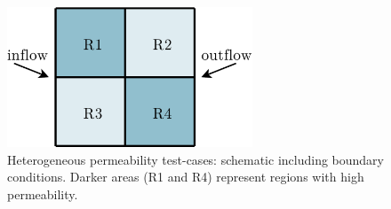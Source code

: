 \begin{figure}[h]
  \begin{center}
    \includegraphics[width=0.65\textwidth]{./diagrams/4Rregion_BL}
    \caption{Heterogeneous permeability test-cases: schematic including boundary conditions. Darker areas (R1 and R4) represent regions with high permeability.\label{fig:4reg_BL_schematic}}
  \end{center}
\end{figure}

